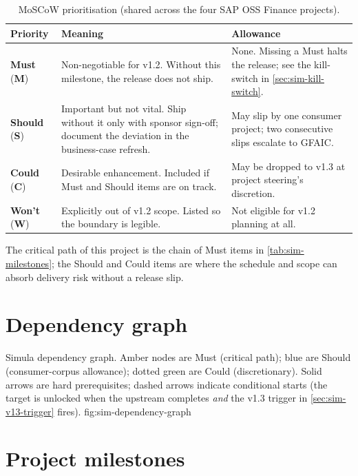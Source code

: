 \begin{table}[htbp]
\centering
\caption{MoSCoW prioritisation (shared across the four SAP OSS Finance
projects).}
\label{tab:sim-moscow}
\footnotesize
\begin{tabularx}{\linewidth}{@{}l l X@{}}
\toprule
\textbf{Priority} & \textbf{Meaning} & \textbf{Allowance} \\ \midrule
\textbf{Must} (\textbf{M}) & Non-negotiable for v1.2. Without this milestone, the release does not ship. & None. Missing a Must halts the release; see the kill-switch in \cref{sec:sim-kill-switch}. \\
\textbf{Should} (\textbf{S}) & Important but not vital. Ship without it only with sponsor sign-off; document the deviation in the business-case refresh. & May slip by one consumer project; two consecutive slips escalate to GFAIC. \\
\textbf{Could} (\textbf{C}) & Desirable enhancement. Included if Must and Should items are on track. & May be dropped to v1.3 at project steering's discretion. \\
\textbf{Won't} (\textbf{W}) & Explicitly out of v1.2 scope. Listed so the boundary is legible. & Not eligible for v1.2 planning at all. \\
\bottomrule
\end{tabularx}
\end{table}

\noindent
The critical path of this project is the chain of Must items in
\cref{tab:sim-milestones}; the Should and Could items are where the
schedule and scope can absorb delivery risk without a release slip.

\section{Dependency graph}\label{sec:sim-dependency-graph}

%
  {Simula dependency graph. Amber nodes are Must (critical path); blue are
    Should (consumer-corpus allowance); dotted green are Could (discretionary).
    Solid arrows are hard prerequisites; dashed arrows indicate conditional
    starts (the target is unlocked when the upstream completes \emph{and} the
    v1.3 trigger in \cref{sec:sim-v13-trigger} fires).}%
  {fig:sim-dependency-graph}

\section{Project milestones}\label{sec:sim-milestones}

